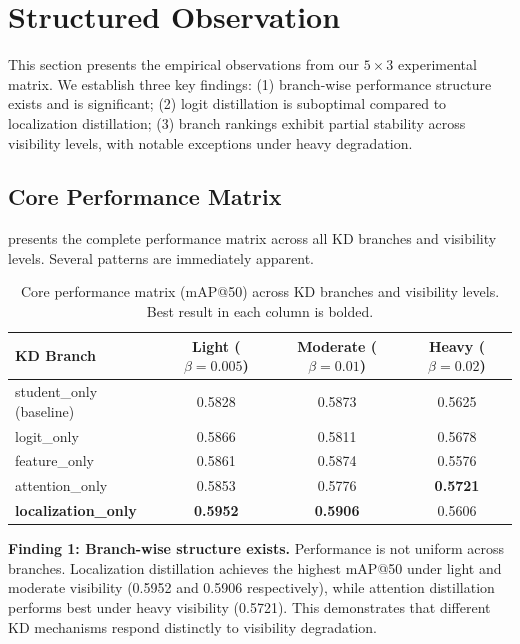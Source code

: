 \section{Structured Observation}
\label{sec:observation}

This section presents the empirical observations from our $5 \times 3$ experimental matrix. We establish three key findings: (1) branch-wise performance structure exists and is significant; (2) logit distillation is suboptimal compared to localization distillation; (3) branch rankings exhibit partial stability across visibility levels, with notable exceptions under heavy degradation.

\subsection{Core Performance Matrix}

 presents the complete performance matrix across all KD branches and visibility levels. Several patterns are immediately apparent.

\begin{table}[htbp]
\centering
\caption{Core performance matrix (mAP@50) across KD branches and visibility levels. Best result in each column is bolded.}
\label{tab:core_matrix}
\begin{tabular}{@{}lccc@{}}
\toprule
KD Branch & Light ($\beta=0.005$) & Moderate ($\beta=0.01$) & Heavy ($\beta=0.02$) \\
\midrule
student\_only (baseline) & 0.5828 & 0.5873 & 0.5625 \\
logit\_only & 0.5866 & 0.5811 & 0.5678 \\
feature\_only & 0.5861 & 0.5874 & 0.5576 \\
attention\_only & 0.5853 & 0.5776 & \textbf{0.5721} \\
\textbf{localization\_only} & \textbf{0.5952} & \textbf{0.5906} & 0.5606 \\
\bottomrule
\end{tabular}
\end{table}

\textbf{Finding 1: Branch-wise structure exists.} Performance is not uniform across branches. Localization distillation achieves the highest mAP@50 under light and moderate visibility (0.5952 and 0.5906 respectively), while attention distillation performs best under heavy visibility (0.5721). This demonstrates that different KD mechanisms respond distinctly to visibility degradation.

